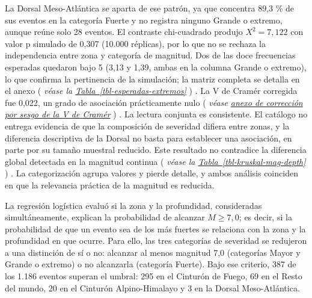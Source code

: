 \documentclass[
  spanish,
  letterpaper,
  DIV=11,
  numbers=noendperiod]{scrartcl}
\newcommand{\asesoriaParenRef}[1]{%
  \textnormal{\textcolor{asesoriaTextColor}{(}}%
  {\hypersetup{linkcolor=asesoriaLinkColor,urlcolor=asesoriaLinkColor,citecolor=asesoriaLinkColor}\textcolor{asesoriaTextColor}{\emph{#1}}}%
  \textnormal{\textcolor{asesoriaTextColor}{)}}%
}
\newcommand{\asesoriaTableLink}[1]{\hyperref[#1]{Tabla~\ref*{#1}}}
\begin{document}
La Dorsal Meso-Atlántica se aparta de ese patrón, ya que concentra 89,3
\% de sus eventos en la categoría Fuerte y no registra ninguno Grande o
extremo, aunque reúne solo 28 eventos. El contraste chi-cuadrado produjo
\(X^2 = 7{,}122\) con valor p simulado de 0,307 (10.000 réplicas), por
lo que no se rechaza la independencia entre zona y categoría de
magnitud. Dos de las doce frecuencias esperadas quedaron bajo 5 (3,13 y
1,39, ambas en la columna Grande o extremo), lo que confirma la
pertinencia de la simulación; la matriz completa se detalla en el anexo
\asesoriaParenRef{véase la \asesoriaTableLink{tbl-esperadas-extremos}}.
La V de Cramér corregida fue 0,022, un grado de asociación prácticamente
nulo
\asesoriaParenRef{véase \hyperref[sec-anexo-cramer]{anexo de corrección por sesgo de la V de Cramér}}.
La lectura conjunta es consistente. El catálogo no entrega evidencia de
que la composición de severidad difiera entre zonas, y la diferencia
descriptiva de la Dorsal no basta para establecer una asociación, en
parte por su tamaño muestral reducido. Este resultado no contradice la
diferencia global detectada en la magnitud continua
\asesoriaParenRef{véase la \asesoriaTableLink{tbl-kruskal-mag-depth}}.
La categorización agrupa valores y pierde detalle, y ambos análisis
coinciden en que la relevancia práctica de la magnitud es reducida.

La regresión logística evaluó si la zona y la profundidad, consideradas
simultáneamente, explican la probabilidad de alcanzar \(M \geq 7{,}0\);
es decir, si la probabilidad de que un evento sea de los más fuertes se
relaciona con la zona y la profundidad en que ocurre. Para ello, las
tres categorías de severidad se redujeron a una distinción de sí o no:
alcanzar al menos magnitud 7,0 (categorías Mayor y Grande o extremo) o
no alcanzarla (categoría Fuerte). Bajo ese criterio, 387 de los 1.186
eventos superan el umbral: 295 en el Cinturón de Fuego, 69 en el Resto
del mundo, 20 en el Cinturón Alpino-Himalayo y 3 en la Dorsal
Meso-Atlántica.
\end{document}
